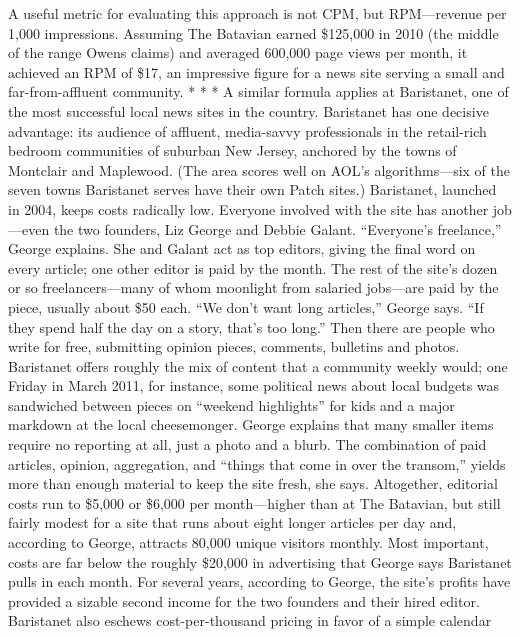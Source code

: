 A useful metric for evaluating this approach is not CPM, but RPM—revenue
per 1,000 impressions. Assuming The Batavian earned \$125,000 in 2010 (the
middle of the range Owens claims) and averaged 600,000 page views per month,
it achieved an RPM of \$17, an impressive figure for a news site serving a small
and far-from-affluent community.
* * *
A similar formula applies at Baristanet, one of the most successful local news
sites in the country. Baristanet has one decisive advantage: its audience of affluent,
media-savvy professionals in the retail-rich bedroom communities of suburban
New Jersey, anchored by the towns of Montclair and Maplewood. (The area
scores well on AOL's algorithms—six of the seven towns Baristanet serves have
their own Patch sites.)
Baristanet, launched in 2004, keeps costs radically low. Everyone involved with
the site has another job—even the two founders, Liz George and Debbie Galant.
``Everyone's freelance,'' George explains. She and Galant act as top editors, giving
the final word on every article; one other editor is paid by the month. The rest
of the site's dozen or so freelancers—many of whom moonlight from salaried
jobs—are paid by the piece, usually about \$50 each. ``We don't want long articles,''
George says. ``If they spend half the day on a story, that's too long.''
Then there are people who write for free, submitting opinion pieces, comments,
bulletins and photos. Baristanet offers roughly the mix of content that a
community weekly would; one Friday in March 2011, for instance, some political
news about local budgets was sandwiched between pieces on ``weekend
highlights'' for kids and a major markdown at the local cheesemonger. George
explains that many smaller items require no reporting at all, just a photo and a
blurb. The combination of paid articles, opinion, aggregation, and ``things that
come in over the transom,'' yields more than enough material to keep the site
fresh, she says.
Altogether, editorial costs run to \$5,000 or \$6,000 per month—higher than at
The Batavian, but still fairly modest for a site that runs about eight longer articles
per day and, according to George, attracts 80,000 unique visitors monthly. Most
important, costs are far below the roughly \$20,000 in advertising that George
says Baristanet pulls in each month. For several years, according to George, the
site's profits have provided a sizable second income for the two founders and
their hired editor.
Baristanet also eschews cost-per-thousand pricing in favor of a simple calendar

